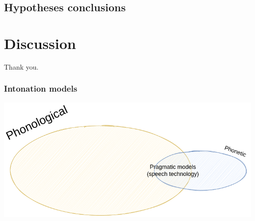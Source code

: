 \documentclass[a4paper,9pt]{beamer}
\theoremstyle{mytheoremstyle}
\begin{document}
\subsection{Hypotheses conclusions}



\section{Discussion}

\begin{frame}

\begin{center}
Thank you.
\end{center}
\end{frame}












\begin{frame}
\frametitle{Intonation models}
\includegraphics[width=\textwidth]{res/inotnation_models_venn.png}
\end{frame}
\end{document}
